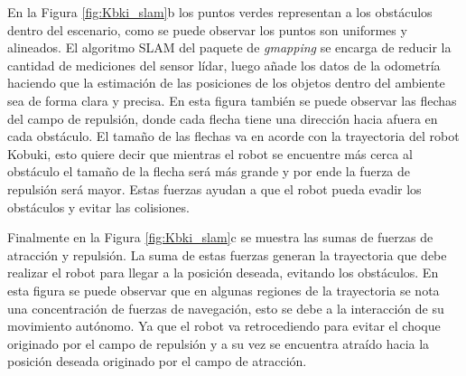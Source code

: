 En la Figura \ref{fig:Kbki_slam}b los puntos verdes representan a los obstáculos dentro
del escenario, como se puede observar los puntos son uniformes y alineados. El algoritmo
SLAM del paquete de \textit{gmapping} se encarga de reducir la cantidad de mediciones del
sensor lídar, luego añade los datos de la odometría haciendo que la estimación de las 
posiciones de los objetos dentro del ambiente sea de forma clara y precisa. En esta figura
también se puede observar las flechas del campo de repulsión, donde cada flecha tiene una
dirección hacia afuera en cada obstáculo. El tamaño de las flechas va en acorde con la 
trayectoria del robot Kobuki, esto quiere decir que mientras el robot se encuentre más
cerca al obstáculo el tamaño de la flecha será más grande y por ende la fuerza de 
repulsión será mayor. Estas fuerzas ayudan a que el robot pueda evadir los obstáculos
y evitar las colisiones. 

Finalmente en la Figura \ref{fig:Kbki_slam}c se muestra las sumas de fuerzas de atracción y
repulsión. La suma de estas fuerzas generan la trayectoria que debe realizar el robot
para llegar a la posición deseada, evitando los obstáculos. En esta figura se puede observar
que en algunas regiones de la trayectoria se nota una concentración de fuerzas de navegación, 
esto se debe a la interacción de su movimiento autónomo. Ya que el robot va retrocediendo para
evitar el choque originado por el campo de repulsión y a su vez se encuentra atraído hacia 
la posición deseada originado por el campo de atracción.


